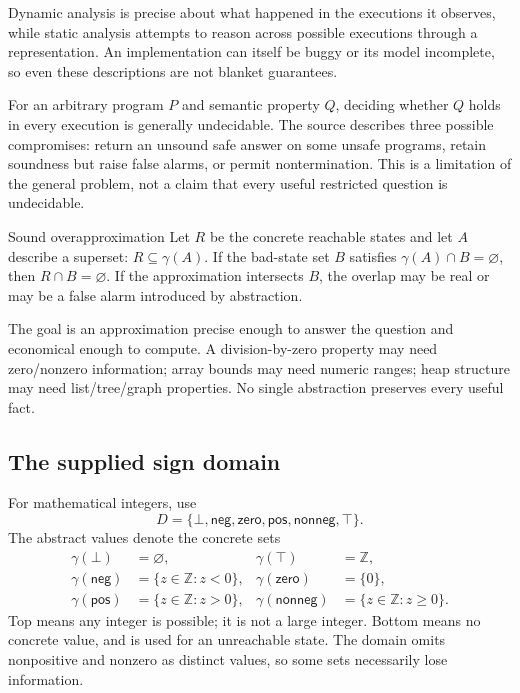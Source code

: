 \documentclass[11pt,a4paper]{article}
\numberwithin{figure}{section}
\begin{document}
Dynamic analysis is precise about what happened in the executions it observes, while static analysis attempts to reason across possible executions through a representation. An implementation can itself be buggy or its model incomplete, so even these descriptions are not blanket guarantees.

For an arbitrary program $P$ and semantic property $Q$, deciding whether $Q$ holds in every execution is generally undecidable. The source describes three possible compromises: return an unsound safe answer on some unsafe programs, retain soundness but raise false alarms, or permit nontermination. This is a limitation of the general problem, not a claim that every useful restricted question is undecidable.

\begin{concept}{Sound overapproximation}
Let $R$ be the concrete reachable states and let $A$ describe a superset: $R\subseteq\gamma(A)$. If the bad-state set $B$ satisfies $\gamma(A)\cap B=\varnothing$, then $R\cap B=\varnothing$. If the approximation intersects $B$, the overlap may be real or may be a false alarm introduced by abstraction.
\end{concept}

The goal is an approximation precise enough to answer the question and economical enough to compute. A division-by-zero property may need zero/nonzero information; array bounds may need numeric ranges; heap structure may need list/tree/graph properties. No single abstraction preserves every useful fact.

\subsection{The supplied sign domain}
For mathematical integers, use
\[
D=\{\bot,\mathsf{neg},\mathsf{zero},\mathsf{pos},\mathsf{nonneg},\top\}.
\]
The abstract values denote the concrete sets
\begin{align*}
\gamma(\bot)&=\varnothing,&\gamma(\top)&=\mathbb Z,\\
\gamma(\mathsf{neg})&=\{z\in\mathbb Z:z<0\},&
\gamma(\mathsf{zero})&=\{0\},\\
\gamma(\mathsf{pos})&=\{z\in\mathbb Z:z>0\},&
\gamma(\mathsf{nonneg})&=\{z\in\mathbb Z:z\ge0\}.
\end{align*}
Top means any integer is possible; it is not a large integer. Bottom means no concrete value, and is used for an unreachable state. The domain omits nonpositive and nonzero as distinct values, so some sets necessarily lose information.
\end{document}
